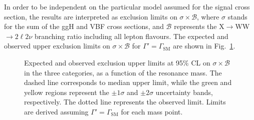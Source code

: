 In order to be independent on the particular model assumed for the signal cross section, the results are interpreted as exclusion limits on $\sigma \times \mathcal{B}$, where $\sigma$ stands for the sum of the ggH and VBF cross sections, and $\mathcal{B}$ represents the X$\to$WW$\to2\ell2\nu$ branching ratio including all lepton flavours. The expected and observed upper exclusion limits on $\sigma \times \mathcal{B}$ for $\Gamma' = \Gamma_\mathrm{SM}$ are shown in Fig.~\ref{fig:13TeVobslim}.

\begin{figure}[htb]
\centering
{}
\caption{Expected and observed exclusion upper limits at 95\% CL on $\sigma \times \mathcal{B}$ in the three categories, as a function of the resonance mass. The dashed line corresponds to median upper limit, while the green and yellow regions represent the $\pm 1\sigma$ and $\pm 2 \sigma$ uncertainty bands, respectively. The dotted line represents the observed limit. Limits are derived assuming $\Gamma' = \Gamma_\mathrm{SM}$ for each mass point.}\label{fig:13TeVobslim}
\end{figure}

